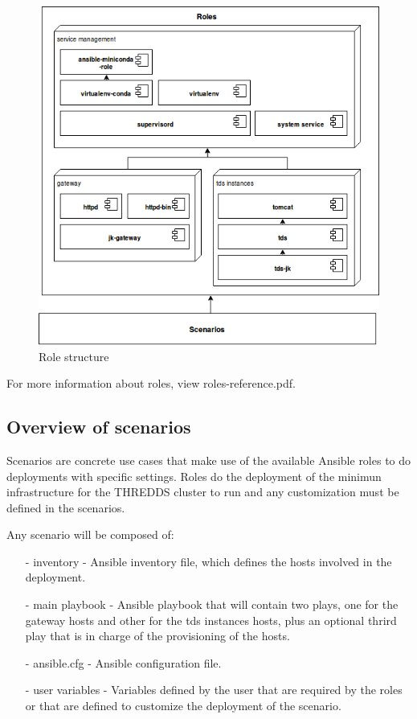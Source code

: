 \documentclass[a4paper,12pt]{article}
\begin{document}
\begin{figure}[H]
\centering
\includegraphics[width=1\textwidth]{images/roles.png}
\caption{Role structure}
\end{figure}

For more information about roles, view roles-reference.pdf.

\subsection{Overview of scenarios}

Scenarios are concrete use cases that make use of the available Ansible roles to do deployments with specific settings. Roles do the deployment of the minimun infrastructure for the THREDDS cluster to run and any customization must be defined in the scenarios.

Any scenario will be composed of:

\begin{itemize}
\item[-] inventory - Ansible inventory file, which defines the hosts involved in the deployment.
\item[-] main playbook - Ansible playbook that will contain two plays, one for the gateway hosts and other for the tds instances hosts, plus an optional thrird play that is in charge of the provisioning of the hosts.
\item[-] ansible.cfg - Ansible configuration file.
\item[-] user variables - Variables defined by the user that are required by the roles or that are defined to customize the deployment of the scenario.
\end{itemize}
\end{document}
